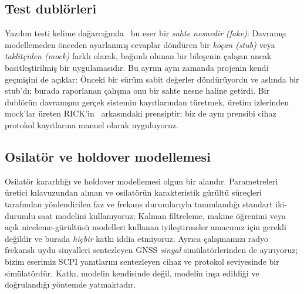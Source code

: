 \documentclass[conference]{IEEEtran}
\begin{document}
\subsection{Test dublörleri}
Yazılım testi kelime dağarcığında~\cite{meszaros2007xunit,fowler2007mocks} bu eser bir \emph{sahte nesnedir (fake)}: Davranışı modellemeden önceden ayarlanmış cevaplar döndüren bir \emph{koçan (stub)} veya \emph{taklitçiden (mock)} farklı olarak, bağımlı olunan bir bileşenin çalışan ancak basitleştirilmiş bir uygulamasıdır. Bu ayrım aynı zamanda projenin kendi geçmişini de açıklar: Önceki bir sürüm sabit değerler döndürüyordu ve aslında bir stub'dı; burada raporlanan çalışma onu bir sahte nesne haline getirdi. Bir dublörün davranışını gerçek sistemin kayıtlarından türetmek, üretim izlerinden mock'lar üreten RICK'in~\cite{tiwari2023rick} arkasındaki prensiptir; biz de aynı prensibi cihaz protokol kayıtlarına manuel olarak uyguluyoruz.

\subsection{Osilatör ve holdover modellemesi}
Osilatör kararlılığı ve holdover modellemesi olgun bir alandır. Parametreleri üretici kılavuzundan alınan ve osilatörün karakteristik gürültü süreçleri~\cite{zucca2005clock} tarafından yönlendirilen faz ve frekans durumlarıyla tanımlandığı standart iki-durumlu saat modelini kullanıyoruz; Kalman filtreleme, makine öğrenimi veya açık niceleme-gürültüsü modelleri kullanan iyileştirmeler amacımız için gerekli değildir ve burada \emph{hiçbir} katkı iddia etmiyoruz. Ayrıca çalışmamızı radyo frekanslı uydu sinyalleri sentezleyen GNSS \emph{sinyal} simülatörlerinden de ayırıyoruz; bizim eserimiz SCPI yanıtlarını sentezleyen cihaz ve protokol seviyesinde bir simülatördür. Katkı, modelin kendisinde değil, modelin inşa edildiği ve doğrulandığı yöntemde yatmaktadır.
\end{document}
